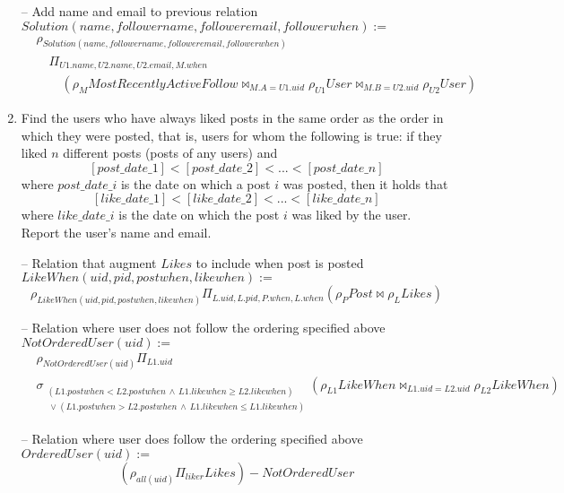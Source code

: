 \documentclass{article}
\newcommand{\var}[1]{\mathit{#1}}
\begin{document}
\begin{enumerate}
{-- Add name and email to previous relation \\
$\var{Solution}(name, followername, followeremail, followerwhen) :=$
\begin{align*}
    &\rho_{\var{Solution}(name, followername, followeremail, followerwhen)}\\ 
    &\quad \Pi_{U1.name, U2.name, U2.email, M.when} \\ 
    &\quad \quad (\rho_{M} \var{MostRecentlyActiveFollow} 
        \bowtie_{M.A=U1.uid} \rho_{U1} \var{User} 
        \bowtie_{M.B=U2.uid} \rho_{U2} \var{User})
\end{align*}


}

\item   %
Find the users who have always liked posts
in the same order as the order in which they were posted,
that is,
users for whom the following is true:
if they liked $n$ different posts (posts of any users)
and
$$[post\_date\_1] < [post\_date\_2] < ... < [post\_date\_n]$$
where $post\_date\_i$ is the date on which a post $i$ was posted, 
then it holds that
$$[like\_date\_1] < [like\_date\_2] < ... < [like\_date\_n]$$ 
where $like\_date\_i$ is the date on which the post $i$ was liked 
by the user.  
Report the user's name and email.

{\large 


-- Relation that augment $\var{Likes}$ to include when post is posted  \\
$\var{LikeWhen}(uid, pid, postwhen, likewhen) :=$
\[
    \rho_{\var{LikeWhen}(uid, pid, postwhen, likewhen)}
    \Pi_{L.uid, L.pid, P.when, L.when}
    (\rho_{P} \var{Post} \bowtie \rho_{L} \var{Likes}) 
\]


-- Relation where user does not follow the ordering specified above \\
$\var{NotOrderedUser}(uid) :=$
\begin{align*}
    &\rho_{\var{NotOrderedUser}(uid)}
    \Pi_{L1.uid} \\
    &\sigma_{
        \substack{
            (L1.postwhen < L2.postwhen \,\land\, L1.likewhen \geq L2.likewhen)   \\
            \,\lor (L1.postwhen > L2.postwhen \,\land\, L1.likewhen \leq L1.likewhen)
        }
    }
    (\rho_{L1} \var{LikeWhen} \bowtie_{L1.uid=L2.uid} \rho_{L2} \var{LikeWhen})
\end{align*}
}

-- Relation where user does follow the ordering specified above \\
$\var{OrderedUser}(uid) :=$
\[
    (\rho_{all(uid)} \Pi_{liker} \var{Likes}) - \var{NotOrderedUser}
\]



\end{enumerate}
\end{document}
